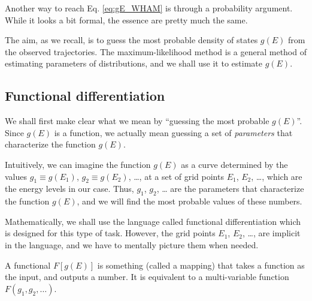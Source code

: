 \documentclass[aip,jcp,preprint,superscriptaddress]{revtex4-1}
\begin{document}
Another way to reach Eq. \eqref{eq:gE_WHAM}
is through a probability argument\cite{
bartels1997, *gallicchio2005, *habeck2007, *habeck2012, zhu2012}.
%
While it looks a bit formal,
the essence are pretty much the same.



The aim, as we recall, is to guess the most probable
density of states $g(E)$ from the observed trajectories.
%
The maximum-likelihood method is a general method of
estimating parameters of distributions,
and we shall use it to estimate $g(E)$.



\subsection{Functional differentiation}



We shall first make clear
what we mean by ``guessing the most probable $g(E)$''.
%
Since $g(E)$ is a function,
we actually mean guessing a set of \emph{parameters}
that characterize the function $g(E)$.
%



Intuitively,
we can imagine the function $g(E)$
as a curve determined by the values
$g_1 \equiv g(E_1)$,
$g_2 \equiv g(E_2)$,
\dots,
at a set of grid points
$E_1$, $E_2$, \dots,
which are the energy levels in our case.
%
Thus,
$g_1$, $g_2$, \dots
are the parameters that characterize the function $g(E)$,
and we will find the most probable values
of these numbers.



Mathematically,
we shall use the language called functional differentiation
which is designed for this type of task.
%
However, the grid points $E_1$, $E_2$, \dots,
are implicit in the language,
and we have to mentally picture them when needed.



A functional $F[g(E)]$ is something (called a mapping)
that takes a function as the input,
and outputs a number.
%
It is equivalent to a multi-variable function
$F(g_1, g_2, \dots)$.
\end{document}
